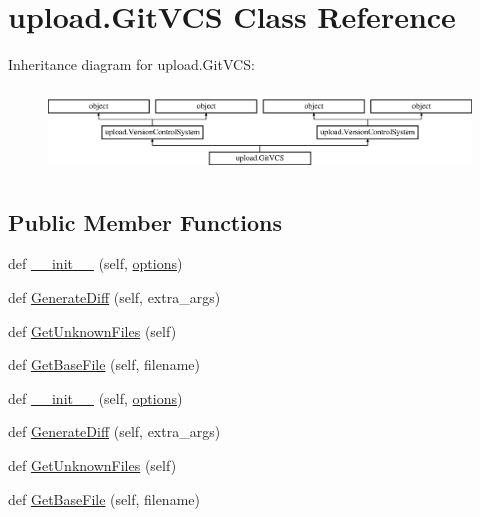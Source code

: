 \hypertarget{classupload_1_1_git_v_c_s}{}\section{upload.\+Git\+V\+CS Class Reference}
\label{classupload_1_1_git_v_c_s}
Inheritance diagram for upload.\+Git\+V\+CS\+:\begin{figure}[H]
\begin{center}
\leavevmode
\includegraphics[height=2.245989cm]{df/daf/classupload_1_1_git_v_c_s}
\end{center}
\end{figure}
\subsection*{Public Member Functions}
\begin{DoxyCompactItemize}
\item 
def \mbox{\hyperlink{classupload_1_1_git_v_c_s_aba4e1dca1c4b3e5db7ba07f6bce3c839}{\+\_\+\+\_\+init\+\_\+\+\_\+}} (self, \mbox{\hyperlink{classupload_1_1_version_control_system_a4d57d043bc408887b94269fe4cea9556}{options}})
\item 
def \mbox{\hyperlink{classupload_1_1_git_v_c_s_a3ebfc01cebc9b585706ad3f4389a8833}{Generate\+Diff}} (self, extra\+\_\+args)
\item 
def \mbox{\hyperlink{classupload_1_1_git_v_c_s_ae4e8c0e9fa01619c6a5c76d1ab84b995}{Get\+Unknown\+Files}} (self)
\item 
def \mbox{\hyperlink{classupload_1_1_git_v_c_s_a70ddb65a6b512b8cb8cc4affa37ff9b4}{Get\+Base\+File}} (self, filename)
\item 
def \mbox{\hyperlink{classupload_1_1_git_v_c_s_aba4e1dca1c4b3e5db7ba07f6bce3c839}{\+\_\+\+\_\+init\+\_\+\+\_\+}} (self, \mbox{\hyperlink{classupload_1_1_version_control_system_a4d57d043bc408887b94269fe4cea9556}{options}})
\item 
def \mbox{\hyperlink{classupload_1_1_git_v_c_s_a3ebfc01cebc9b585706ad3f4389a8833}{Generate\+Diff}} (self, extra\+\_\+args)
\item 
def \mbox{\hyperlink{classupload_1_1_git_v_c_s_ae4e8c0e9fa01619c6a5c76d1ab84b995}{Get\+Unknown\+Files}} (self)
\item 
def \mbox{\hyperlink{classupload_1_1_git_v_c_s_a70ddb65a6b512b8cb8cc4affa37ff9b4}{Get\+Base\+File}} (self, filename)
\end{DoxyCompactItemize}
